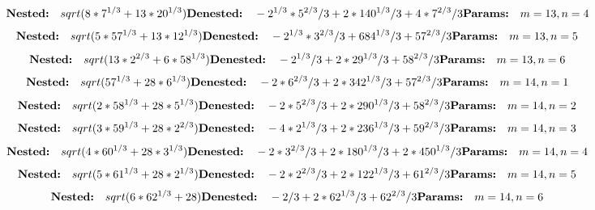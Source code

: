 \[
\textbf{Nested:}\quad sqrt(8*7^{1/3} + 13*20^{1/3}) \\
\textbf{Denested:}\quad -2^{1/3}*5^{2/3}/3 + 2*140^{1/3}/3 + 4*7^{2/3}/3 \\
\textbf{Params:}\quad m=13, n=4
\]
\[
\textbf{Nested:}\quad sqrt(5*57^{1/3} + 13*12^{1/3}) \\
\textbf{Denested:}\quad -2^{1/3}*3^{2/3}/3 + 684^{1/3}/3 + 57^{2/3}/3 \\
\textbf{Params:}\quad m=13, n=5
\]
\[
\textbf{Nested:}\quad sqrt(13*2^{2/3} + 6*58^{1/3}) \\
\textbf{Denested:}\quad -2^{1/3}/3 + 2*29^{1/3}/3 + 58^{2/3}/3 \\
\textbf{Params:}\quad m=13, n=6
\]
\[
\textbf{Nested:}\quad sqrt(57^{1/3} + 28*6^{1/3}) \\
\textbf{Denested:}\quad -2*6^{2/3}/3 + 2*342^{1/3}/3 + 57^{2/3}/3 \\
\textbf{Params:}\quad m=14, n=1
\]
\[
\textbf{Nested:}\quad sqrt(2*58^{1/3} + 28*5^{1/3}) \\
\textbf{Denested:}\quad -2*5^{2/3}/3 + 2*290^{1/3}/3 + 58^{2/3}/3 \\
\textbf{Params:}\quad m=14, n=2
\]
\[
\textbf{Nested:}\quad sqrt(3*59^{1/3} + 28*2^{2/3}) \\
\textbf{Denested:}\quad -4*2^{1/3}/3 + 2*236^{1/3}/3 + 59^{2/3}/3 \\
\textbf{Params:}\quad m=14, n=3
\]
\[
\textbf{Nested:}\quad sqrt(4*60^{1/3} + 28*3^{1/3}) \\
\textbf{Denested:}\quad -2*3^{2/3}/3 + 2*180^{1/3}/3 + 2*450^{1/3}/3 \\
\textbf{Params:}\quad m=14, n=4
\]
\[
\textbf{Nested:}\quad sqrt(5*61^{1/3} + 28*2^{1/3}) \\
\textbf{Denested:}\quad -2*2^{2/3}/3 + 2*122^{1/3}/3 + 61^{2/3}/3 \\
\textbf{Params:}\quad m=14, n=5
\]
\[
\textbf{Nested:}\quad sqrt(6*62^{1/3} + 28) \\
\textbf{Denested:}\quad -2/3 + 2*62^{1/3}/3 + 62^{2/3}/3 \\
\textbf{Params:}\quad m=14, n=6
\]

